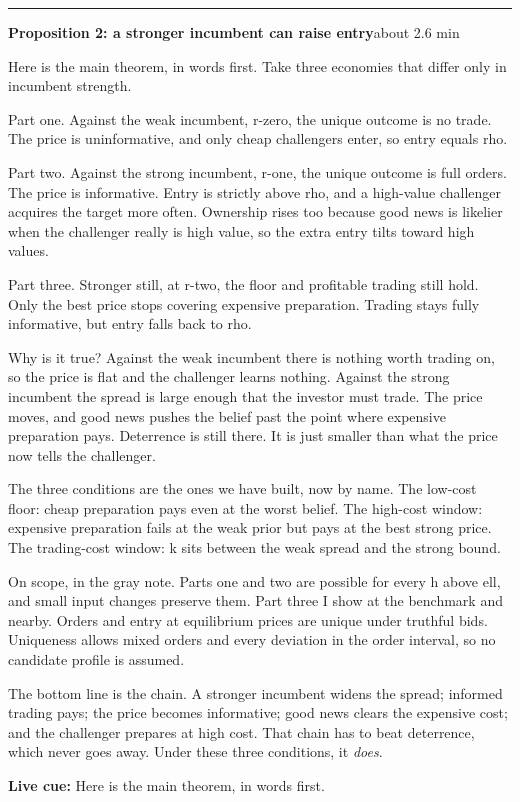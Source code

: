 \documentclass[11pt]{article}
\newcommand{\Cue}[1]{\par\nobreak\smallskip\noindent
  \textcolor{ScriptGray}{\footnotesize\textbf{Live cue:} #1}\par}
\newcommand{\scriptframe}[3]{%
  \Needspace{9\baselineskip}%
  \par\medskip\noindent\textcolor{ScriptBlue}{\rule{\linewidth}{0.55pt}}%
  \par\smallskip\noindent
  \textbf{#1}\hfill\textcolor{ScriptGray}{\small #2}\par\smallskip
  #3\par}
\begin{document}
\scriptframe{Proposition 2: a stronger incumbent can raise entry}{about 2.6 min}{%
  Here is the main theorem, in words first. Take three economies that differ
  only in incumbent strength.

  Part one. Against the weak incumbent, r-zero, the unique outcome is no trade.
  The price is uninformative, and only cheap challengers enter, so entry equals
  rho.

  Part two. Against the strong incumbent, r-one, the unique outcome is full
  orders. The price is informative. Entry is strictly above rho, and a
  high-value challenger acquires the target more often. Ownership rises too
  because good news is likelier when the challenger really is high value, so
  the extra entry tilts toward high values.

  Part three. Stronger still, at r-two, the floor and profitable trading still
  hold. Only the best price stops covering expensive preparation. Trading stays
  fully informative, but entry falls back to rho.

  Why is it true? Against the weak incumbent there is nothing worth trading on,
  so the price is flat and the challenger learns nothing. Against the strong
  incumbent the spread is large enough that the investor must trade. The price
  moves, and good news pushes the belief past the point where expensive
  preparation pays. Deterrence is still there. It is just smaller than what the
  price now tells the challenger.

  The three conditions are the ones we have built, now by name. The low-cost
  floor: cheap preparation pays even at the worst belief. The high-cost window:
  expensive preparation fails at the weak prior but pays at the best strong
  price. The trading-cost window: k sits between the weak spread and the strong
  bound.

  On scope, in the gray note. Parts one and two are possible for every h above
  ell, and small input changes preserve them. Part three I show at the
  benchmark and nearby. Orders and entry at equilibrium prices are unique under
  truthful bids. Uniqueness allows mixed orders and every deviation in the
  order interval, so no candidate profile is assumed.

  The bottom line is the chain. A stronger incumbent widens the spread; informed
  trading pays; the price becomes informative; good news clears the expensive
  cost; and the challenger prepares at high cost. That chain has to beat deterrence,
  which never goes away. Under these three conditions, it \emph{does}.
  \Cue{Here is the main theorem, in words first.}
}
\end{document}
